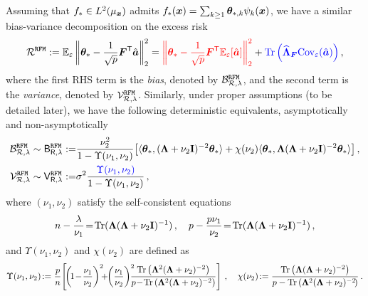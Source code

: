 Assuming that $f_* \in L^2(\mu_{\boldsymbol x})$ admits $f_*({\boldsymbol x})=\sum_{k\geq1}{\boldsymbol \theta}_{*,k}\psi_k({\boldsymbol x})$, we have a similar bias-variance decomposition on the excess risk
\[
\begin{aligned}
    \mathcal{R}^{\tt RFM} := \mathbb{E}_{\varepsilon} \left\|{\boldsymbol \theta}_* - \frac{1}{\sqrt{p}} {\boldsymbol F}^{\mathsf T}\hat{{\boldsymbol a}} \right\|_2^2
    = {\color{red}\left\|{\boldsymbol \theta}_* - \frac{1}{\sqrt{p}}{\boldsymbol F}^{\mathsf T} \mathbb{E}_{\varepsilon}[\hat{{\boldsymbol a}}] \right\|_2^2} +  {\color{blue}{\rm Tr}\left(\widehat{{\boldsymbol \Lambda}}_{\boldsymbol F} \mathrm{Cov}_{\varepsilon}(\hat{{\boldsymbol a}})\right)}\,,
\end{aligned}
\]
where the first RHS term is the {\color{red}\emph{bias}}, denoted by $\mathcal{B}^{\tt RFM}_{\mathcal{R},\lambda}$, and the second term is the {\color{blue}\emph{variance}}, denoted by $\mathcal{V}^{\tt RFM}_{\mathcal{R},\lambda}$. 
Similarly, under proper assumptions (to be detailed later), we have the following deterministic equivalents, asymptotically \citep{simonmore} and non-asymptotically \citep{defilippis2024dimension}
\begin{align}
    \mathcal{B}^{\tt RFM}_{\mathcal{R},\lambda} \sim \mathsf B^{\tt RFM}_{\mathsf R,\lambda} :=& \frac{\nu_2^2}{1 - \Upsilon(\nu_1, \nu_2)} \big[ \langle {\boldsymbol \theta}_*, ({\boldsymbol \Lambda} + \nu_2{\mathbf I})^{-2} {\boldsymbol \theta}_* \rangle \notag + \chi(\nu_2) \langle {\boldsymbol \theta}_*, {\boldsymbol \Lambda} ({\boldsymbol \Lambda} + \nu_2{\mathbf I})^{-2} {\boldsymbol \theta}_* \rangle \big]\,, \\
        \mathcal{V}^{\tt RFM}_{\mathcal{R},\lambda} \sim \mathsf V^{\tt RFM}_{\mathsf R,\lambda} :=& \sigma^2\frac{{\color{blue}\Upsilon(\nu_1, \nu_2)}}{1 - \Upsilon(\nu_1, \nu_2)}\,, \label{eq:de_risk_rf} 
\end{align}
where $(\nu_1,\nu_2)$ satisfy the self-consistent equations
\begin{equation*}\label{eq:def_nu}
        n - \frac{\lambda}{\nu_1} \!=\! {\rm Tr} ( {\boldsymbol \Lambda} ( {\boldsymbol \Lambda} + \nu_2 {\mathbf I} )^{-1} )\,,\quad p - \frac{p\nu_1}{\nu_2} \!=\! {\rm Tr} ( {\boldsymbol \Lambda} ( {\boldsymbol \Lambda} + \nu_2 {\mathbf I} )^{-1} )\,,
\end{equation*}
and $\Upsilon(\nu_1, \nu_2)$ and $\chi(\nu_2)$ are defined as
\[
\begin{aligned}
    \Upsilon(\nu_1, \nu_2) \!:= \frac{p}{n}\!\left[\! \left(\!1 \!-\! \frac{\nu_1}{\nu_2}\right)^2 \!\!\!+\!\! \left(\frac{\nu_1}{\nu_2}\right)^{2}\!\!\!\! \frac{\Tr\left(\bLambda^2 (\bLambda + \nu_2)^{-2}\right)}{p \!-\! \Tr\left(\bLambda^2 (\bLambda + \nu_2)^{-2}\right)} \right]\,, \quad \chi(\nu_2) \!:= \frac{\Tr\left(\bLambda (\bLambda + \nu_2)^{-2}\right)}{p - \Tr\left(\bLambda^2 (\bLambda + \nu_2)^{-2}\!\right)}\,.
\end{aligned}
\]
